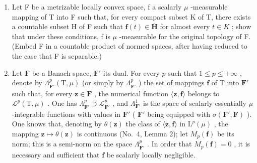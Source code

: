 \begin{enumerate}
\def\labelenumi{\arabic{enumi})}
\setcounter{enumi}{14}
\item
  Let F be a metrizable locally convex space, f a scalarly \(\mu\) -measurable mapping of T into F such that, for every compact subset K of T, there exists a countable subset H of F such that \(\mathbf{f}(t) \in \overline{\mathbf{H}}\) for almost every \(t \in K\) ; show that under these conditions, f is \(\mu\) -measurable for the original topology of F. (Embed F in a countable product of normed spaces, after having reduced to the case that F is separable.)
\item
  Let \(\mathbf{F}\) be a Banach space, \(\mathbf{F}'\) its dual. For every \(p\) such that \(1 \leqslant p \leqslant +\infty\) , denote by \(\Lambda_{\mathbf{F}'}^p(\mathrm{T},\mu)\) (or simply by \(\Lambda_{\mathbf{F}'}^p\) ) the set of mappings \(\mathbf{f}\) of \(\mathrm{T}\) into \(\mathbf{F}'\) such that, for every \(\mathbf{z} \in \mathbf{F}\) , the numerical function \(\langle \mathbf{z},\mathbf{f}\rangle\) belongs to \(\mathcal{L}^p(\mathrm{T},\mu)\) . One has \(\Lambda_{\mathbf{F}'}^p \supset \mathcal{L}_{\mathbf{F}'}^p\) , and \(\Lambda_{\mathbf{F}'}^1\) is the space of scalarly essentially \(\mu\) -integrable functions with values in \(\mathbf{F}'\) ( \(\mathbf{F}'\) being equipped with \(\sigma(\mathbf{F}',\mathbf{F})\) ). One knows that, denoting by \(\theta(\mathbf{z})\) the class of \(\langle \mathbf{z},\mathbf{f}\rangle\) in \(\mathrm{L}^p(\mu)\) , the mapping \(\mathbf{z} \mapsto \theta(\mathbf{z})\) is continuous (No.~4, Lemma 2); let \(M_p(\mathbf{f})\) be its norm; this is a semi-norm on the space \(\Lambda_{\mathbf{F}'}^p\) . In order that \(M_p(\mathbf{f}) = 0\) , it is necessary and sufficient that \(\mathbf{f}\) be scalarly locally negligible.
\end{enumerate}

